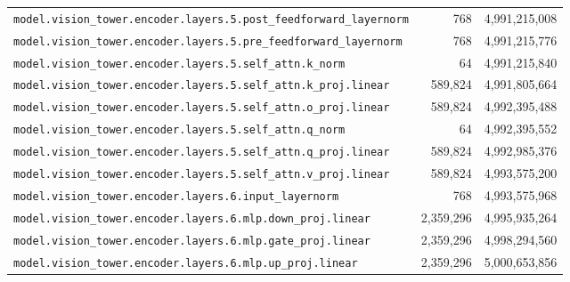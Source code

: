 \documentclass[10pt,a4paper]{article}
\theoremstyle{definition}
\begin{document}
\begin{appendices}
\begin{longtable}{p{9.5cm}rr}
\texttt{model.\allowbreak{}vision\_tower.\allowbreak{}encoder.\allowbreak{}layers.\allowbreak{}5.\allowbreak{}post\_feedforward\_layernorm} & 768 & 4,991,215,008 \\
\texttt{model.\allowbreak{}vision\_tower.\allowbreak{}encoder.\allowbreak{}layers.\allowbreak{}5.\allowbreak{}pre\_feedforward\_layernorm} & 768 & 4,991,215,776 \\
\texttt{model.\allowbreak{}vision\_tower.\allowbreak{}encoder.\allowbreak{}layers.\allowbreak{}5.\allowbreak{}self\_attn.\allowbreak{}k\_norm} & 64 & 4,991,215,840 \\
\texttt{model.\allowbreak{}vision\_tower.\allowbreak{}encoder.\allowbreak{}layers.\allowbreak{}5.\allowbreak{}self\_attn.\allowbreak{}k\_proj.\allowbreak{}linear} & 589,824 & 4,991,805,664 \\
\texttt{model.\allowbreak{}vision\_tower.\allowbreak{}encoder.\allowbreak{}layers.\allowbreak{}5.\allowbreak{}self\_attn.\allowbreak{}o\_proj.\allowbreak{}linear} & 589,824 & 4,992,395,488 \\
\texttt{model.\allowbreak{}vision\_tower.\allowbreak{}encoder.\allowbreak{}layers.\allowbreak{}5.\allowbreak{}self\_attn.\allowbreak{}q\_norm} & 64 & 4,992,395,552 \\
\texttt{model.\allowbreak{}vision\_tower.\allowbreak{}encoder.\allowbreak{}layers.\allowbreak{}5.\allowbreak{}self\_attn.\allowbreak{}q\_proj.\allowbreak{}linear} & 589,824 & 4,992,985,376 \\
\texttt{model.\allowbreak{}vision\_tower.\allowbreak{}encoder.\allowbreak{}layers.\allowbreak{}5.\allowbreak{}self\_attn.\allowbreak{}v\_proj.\allowbreak{}linear} & 589,824 & 4,993,575,200 \\
\texttt{model.\allowbreak{}vision\_tower.\allowbreak{}encoder.\allowbreak{}layers.\allowbreak{}6.\allowbreak{}input\_layernorm} & 768 & 4,993,575,968 \\
\texttt{model.\allowbreak{}vision\_tower.\allowbreak{}encoder.\allowbreak{}layers.\allowbreak{}6.\allowbreak{}mlp.\allowbreak{}down\_proj.\allowbreak{}linear} & 2,359,296 & 4,995,935,264 \\
\texttt{model.\allowbreak{}vision\_tower.\allowbreak{}encoder.\allowbreak{}layers.\allowbreak{}6.\allowbreak{}mlp.\allowbreak{}gate\_proj.\allowbreak{}linear} & 2,359,296 & 4,998,294,560 \\
\texttt{model.\allowbreak{}vision\_tower.\allowbreak{}encoder.\allowbreak{}layers.\allowbreak{}6.\allowbreak{}mlp.\allowbreak{}up\_proj.\allowbreak{}linear} & 2,359,296 & 5,000,653,856 \\

\end{longtable}
\end{appendices}
\end{document}
